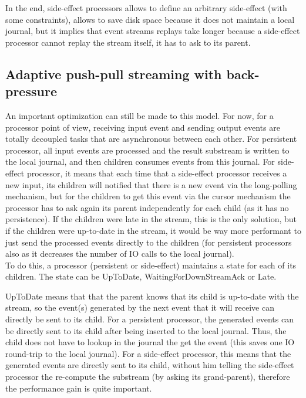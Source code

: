 In the end, side-effect processors allows to define an arbitrary side-effect (with some constraints), allows to save disk space because it does not maintain
a local journal, but it implies that event streams replays take longer because a side-effect processor cannot replay the stream itself, it has to ask to its parent.


\subsection{Adaptive push-pull streaming with back-pressure}

An important optimization can still be made to this model. For now, for a processor point of view, receiving input event and sending output events are totally
decoupled tasks that are asynchronous between each other. For persistent processor, all input events are processed and the result substream is written to the local journal, and then children consumes events from this journal. For side-effect processor, it means that each time that a side-effect processor receives a new input, its children will notified that there is a new event via the long-polling mechanism, but for the children to get this event via the cursor mechanism the processor has to ask again its parent independently for each child (as it has no persistence). 
If the children were late in the stream, this is the only solution, but if the children were up-to-date in the stream, it would be way more performant to just send the processed events directly to the children (for persistent processors also as it decreases the number of IO calls to the local journal).
\\

To do this, a processor (persistent or side-effect) maintains a state for each of its children. The state can be UpToDate, WaitingForDownStreamAck or Late.

UpToDate means that that the parent knows that its child is up-to-date with the stream, so the event(s) generated by the next event that it will receive can 
directly be sent to its child. For a persistent processor, the generated events can be directly sent to its child after being inserted to the local journal. Thus,
the child does not have to lookup in the journal the get the event (this saves one IO round-trip to the local journal). For a side-effect processor, this means
that the generated events are directly sent to its child, without him telling the side-effect processor the re-compute the substream (by asking its grand-parent), therefore the performance gain is quite important.

